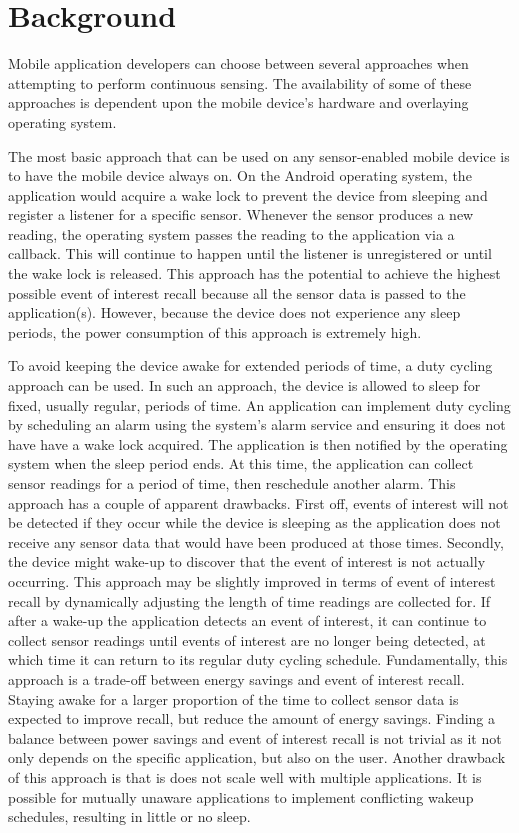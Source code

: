 
\section{Background}
\label{sec:background}

Mobile application developers can choose between several approaches when attempting to perform continuous sensing. The availability of some of these approaches is dependent upon the mobile device's hardware and overlaying operating system. 

The most basic approach that can be used on any sensor-enabled mobile device is to have the mobile device always on. On the Android operating system, the application would acquire a wake lock to prevent the device from sleeping and register a listener for a specific sensor. Whenever the sensor produces a new reading, the operating system passes the reading to the application via a callback. This will continue to happen until the listener is unregistered or until the wake lock is released. This approach has the potential to achieve the highest possible event of interest recall because all the sensor data is passed to the application(s). However, because the device does not experience any sleep periods, the power consumption of this approach is extremely high.

To avoid keeping the device awake for extended periods of time, a duty cycling approach can be used. In such an approach, the device is allowed to sleep for fixed, usually regular, periods of time. An application can implement duty cycling by scheduling an alarm using the system's alarm service and ensuring it does not have have a wake lock acquired. The application is then notified by the operating system when the sleep period ends. At this time, the application can collect sensor readings for a period of time, then reschedule another alarm. This approach has a couple of apparent drawbacks. First off, events of interest will not be detected if they occur while the device is sleeping as the application does not receive any sensor data that would have been produced at those times. Secondly, the device might wake-up to discover that the event of interest is not actually occurring. This approach may be slightly improved in terms of event of interest recall by dynamically adjusting the length of time readings are collected for. If after a wake-up the application detects an event of interest, it can continue to collect sensor readings until events of interest are no longer being detected, at which time it can return to its regular duty cycling schedule. Fundamentally, this approach is a trade-off between energy savings and event of interest recall. Staying awake for a larger proportion of the time to collect sensor data is expected to improve recall, but reduce the amount of energy savings. Finding a balance between power savings and event of interest recall is not trivial as it not only depends on the specific application, but also on the user. Another drawback of this approach is that is does not scale well with multiple applications. It is possible for mutually unaware applications to implement conflicting wakeup schedules, resulting in little or no sleep.

